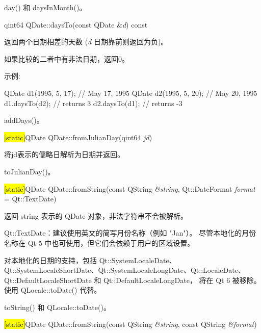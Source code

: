\begin{seeAlso}
day() 和 daysInMonth()。
\end{seeAlso}

\splitLine

qint64 QDate::daysTo(const QDate \&\emph{d}) const

返回两个日期相差的天数 (\emph{d} 日期靠前则返回为负)。

如果比较的二者中有非法日期，返回0。

示例:

\begin{cppcode}
QDate d1(1995, 5, 17);  // May 17, 1995
QDate d2(1995, 5, 20);  // May 20, 1995
d1.daysTo(d2);          // returns 3
d2.daysTo(d1);          // returns -3
\end{cppcode}


\begin{seeAlso}
addDays()。
\end{seeAlso}

\splitLine

\hl{[static]}QDate QDate::fromJulianDay(qint64 \emph{jd})

将jd表示的儒略日解析为日期并返回。

\begin{seeAlso}
toJulianDay()。
\end{seeAlso}

\splitLine

\hl{[static]}QDate QDate::fromString(const QString \emph{\&string},
Qt::DateFormat \emph{format} = Qt::TextDate)

返回 string 表示的 QDate 对象，非法字符串不会被解析。

\begin{notice}
Qt::TextDate：建议使用英文的简写月份名称（例如 "Jan"）。
尽管本地化的月份名称在 Qt 5 中也可使用，但它们会依赖于用户的区域设置。
\end{notice}

\begin{notice}
对本地化的日期的支持，包括 Qt::SystemLocaleDate、Qt::SystemLocaleShortDate、Qt::SystemLocaleLongDate、Qt::LocaleDate、Qt::DefaultLocaleShortDate 和 Qt::DefaultLocaleLongDate，
将在 Qt 6 被移除。使用 QLocale::toDate() 代替。
\end{notice} 

\begin{seeAlso}
toString() 和 QLocale::toDate()。
\end{seeAlso}

\splitLine

\hl{[static]}QDate QDate::fromString(const QString \emph{\&string}, const QString \emph{\&format})

